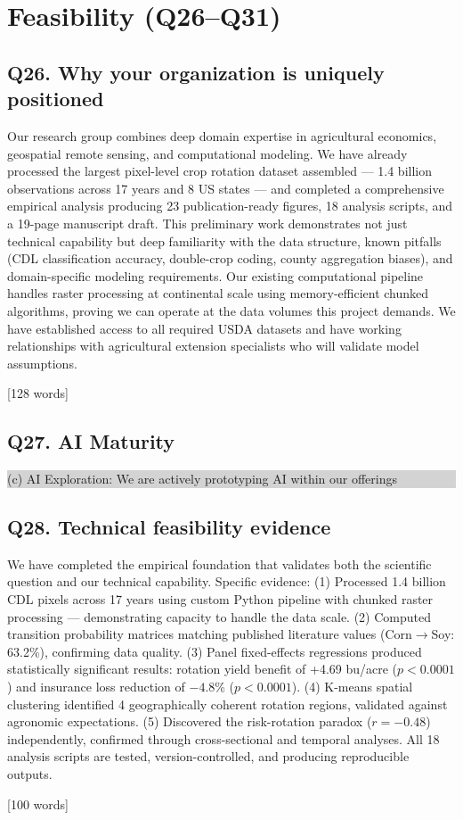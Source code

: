\documentclass[11pt,letterpaper]{article}
\newcommand{\answer}[1]{%
    \vspace{0.2em}%
    \noindent\colorbox{answerbox}{\parbox{\dimexpr\textwidth-2\fboxsep}{%
        \vspace{0.4em}#1\vspace{0.4em}%
    }}%
    \vspace{0.5em}%
}
\newcommand{\selection}[1]{%
    \vspace{0.2em}%
    \noindent\colorbox{lightgray}{\parbox{\dimexpr\textwidth-2\fboxsep}{%
        \vspace{0.3em}#1\vspace{0.3em}%
    }}%
    \vspace{0.5em}%
}
\newcommand{\wordcount}[1]{%
    \hfill{\scriptsize\textcolor{notegray}{[#1 words]}}%
}
\begin{document}
\section{Feasibility (Q26--Q31)}

\subsection{Q26. Why your organization is uniquely positioned}
\answer{Our research group combines deep domain expertise in agricultural economics, geospatial remote sensing, and computational modeling. We have already processed the largest pixel-level crop rotation dataset assembled --- 1.4 billion observations across 17 years and 8 US states --- and completed a comprehensive empirical analysis producing 23 publication-ready figures, 18 analysis scripts, and a 19-page manuscript draft. This preliminary work demonstrates not just technical capability but deep familiarity with the data structure, known pitfalls (CDL classification accuracy, double-crop coding, county aggregation biases), and domain-specific modeling requirements. Our existing computational pipeline handles raster processing at continental scale using memory-efficient chunked algorithms, proving we can operate at the data volumes this project demands. We have established access to all required USDA datasets and have working relationships with agricultural extension specialists who will validate model assumptions.}
\wordcount{128}

\subsection{Q27. AI Maturity}
\selection{(c) AI Exploration: We are actively prototyping AI within our offerings}

\subsection{Q28. Technical feasibility evidence}
\answer{We have completed the empirical foundation that validates both the scientific question and our technical capability. Specific evidence: (1) Processed 1.4 billion CDL pixels across 17 years using custom Python pipeline with chunked raster processing --- demonstrating capacity to handle the data scale. (2) Computed transition probability matrices matching published literature values (Corn$\to$Soy: 63.2\%), confirming data quality. (3) Panel fixed-effects regressions produced statistically significant results: rotation yield benefit of +4.69 bu/acre ($p < 0.0001$) and insurance loss reduction of $-4.8$\% ($p < 0.0001$). (4) K-means spatial clustering identified 4 geographically coherent rotation regions, validated against agronomic expectations. (5) Discovered the risk-rotation paradox ($r = -0.48$) independently, confirmed through cross-sectional and temporal analyses. All 18 analysis scripts are tested, version-controlled, and producing reproducible outputs.}
\wordcount{100}
\end{document}
